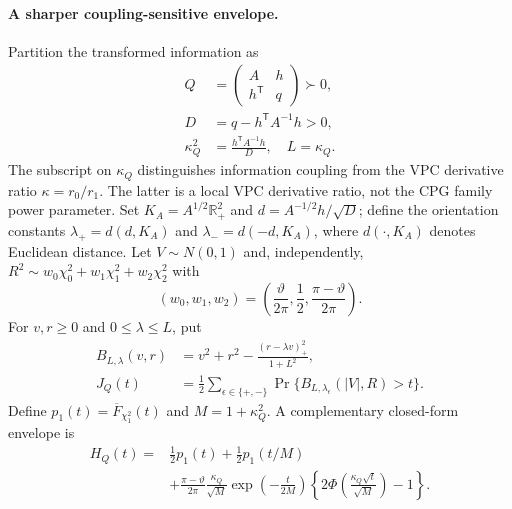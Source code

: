 \paragraph{A sharper coupling-sensitive envelope.}
Partition the transformed information as
\begin{equation}\label{eq:eq_Qblocks}
 \begin{aligned}
 Q&=\begin{pmatrix}A&h\\h^{\mathsf T}&q\end{pmatrix}\succ0,\\
 D&=q-h^{\mathsf T}A^{-1}h>0,\\
 \kappa_Q^2&=\frac{h^{\mathsf T}A^{-1}h}{D},
 \quad L=\kappa_Q.
 \end{aligned}
\end{equation}
The subscript on $\kappa_Q$ distinguishes information coupling
from the VPC derivative ratio $\kappa=r_0/r_1$. The latter is a
local VPC derivative ratio, not the CPG family power parameter.
Set $K_A=A^{1/2}\mathbb R_+^2$ and
$d=A^{-1/2}h/\sqrt D$; define the orientation constants
$\lambda_+=d(d,K_A)$ and $\lambda_-=d(-d,K_A)$, where $d(\cdot,K_A)$
denotes Euclidean distance. Let $V\sim N(0,1)$ and, independently,
$R^2\sim w_0\chi_0^2+w_1\chi_1^2+w_2\chi_2^2$ with
\begin{equation}\label{eq:eq_wmix}
 (w_0,w_1,w_2)=\left(\frac{\vartheta}{2\pi},\frac12,
 \frac{\pi-\vartheta}{2\pi}\right).
\end{equation}
For $v,r\geq0$ and $0\leq\lambda\leq L$, put
\begin{equation}\label{eq:eq_Blambda}
 \begin{aligned}
 B_{L,\lambda}(v,r)&=v^2+r^2-\frac{(r-\lambda v)_+^2}{1+L^2},\\
 J_Q(t)&=\frac12\sum_{\epsilon\in\{+,-\}}
 \Pr\{B_{L,\lambda_\epsilon}(|V|,R)>t\}.
 \end{aligned}
\end{equation}
Define $p_1(t)=\overline F_{\chi_1^2}(t)$ and $M=1+\kappa_Q^2$.
A complementary closed-form envelope is
\begin{equation}\label{eq:eq_Hbound}
 \begin{split}
 H_Q(t)={}&\frac12p_1(t)+\frac12p_1(t/M)\\
 &+\frac{\pi-\vartheta}{2\pi}\frac{\kappa_Q}{\sqrt M}
 \exp\!\left(-\frac{t}{2M}\right)
 \left\{2\Phi\!\left(\frac{\kappa_Q\sqrt t}{\sqrt M}\right)-1\right\}.
 \end{split}
\end{equation}
